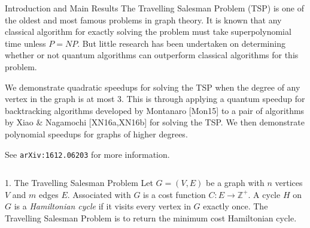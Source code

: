 \documentclass[]{templates/poster}
\begin{document}

\begin{frame}{} 

\begin{columns}[t]
  \begin{column}{0.900\linewidth}
  \begin{block}{\Large Introduction and Main Results}
  The Travelling Salesman Problem (TSP) is one of the oldest and most famous problems in graph theory. It is known that any classical algorithm for exactly solving the problem must take superpolynomial time unless $P = NP$. But little research has been undertaken on determining whether or not quantum algorithms can outperform classical algorithms for this problem.
  
  We demonstrate quadratic speedups for solving the TSP when the degree of any vertex in the graph is at most $3$. This is through applying a quantum speedup for backtracking algorithms developed by Montanaro [Mon15] to a pair of algorithms by Xiao \& Nagamochi [XN16a,XN16b] for solving the TSP. We then demonstrate polynomial speedups for graphs of higher degrees. 
  
  See {\tt arXiv:1612.06203} for more information.
  \end{block}
  \end{column}
\end{columns}

\begin{columns}[t]
  \begin{column}{0.422\linewidth}
  \begin{block}{\Large 1. The Travelling Salesman Problem}
  Let $G = (V, E)$ be a graph with $n$ vertices $V$ and $m$ edges $E$. Associated with $G$ is a cost function $C \colon E \rightarrow \mathbb{Z}^+$. A cycle $H$ on $G$ is a {\em Hamiltonian cycle} if it visits every vertex in $G$ exactly once. The Travelling Salesman Problem is to return the minimum cost Hamiltonian cycle.
  

\end{block}
\end{column}
\end{columns}
\end{frame}
\end{document}
